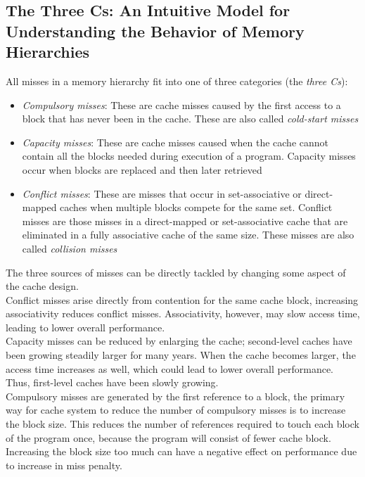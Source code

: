 \documentclass[12pt]{article}
\theoremstyle{definition}
\begin{document}
  \subsection{The Three Cs: An Intuitive Model for Understanding the Behavior of Memory Hierarchies}
  All misses in a memory hierarchy fit into one of three categories (the \emph{three Cs}):
  \begin{itemize}
    \item \emph{Compulsory misses}: These are cache misses caused by the first access to a block that has never been in the cache.
    These are also called \emph{cold-start misses}
    \item \emph{Capacity misses}: These are cache misses caused when the cache cannot contain all the blocks needed during execution of a program.
    Capacity misses occur when blocks are replaced and then later retrieved
    \item \emph{Conflict misses}: These are misses that occur in set-associative or direct-mapped caches when multiple blocks compete for the same set.
    Conflict misses are those misses in a direct-mapped or set-associative cache that are eliminated in a fully associative cache of the same size.
    These misses are also called \emph{collision misses}
  \end{itemize}

  The three sources of misses can be directly tackled by changing some aspect of the cache design. \\

  Conflict misses arise directly from contention for the same cache block, increasing associativity reduces conflict misses.
  Associativity, however, may slow access time, leading to lower overall performance. \\

  Capacity misses can be reduced by enlarging the cache;
  second-level caches have been growing steadily larger for many years.
  When the cache becomes larger, the access time increases as well, which could lead to lower overall performance.
  Thus, first-level caches have been slowly growing. \\

  Compulsory misses are generated by the first reference to a block, the primary way for cache system to reduce the number of compulsory misses is to increase the block size.
  This reduces the number of references required to touch each block of the program once, because the program will consist of fewer cache block.
  Increasing the block size too much can have a negative effect on performance due to increase in miss penalty.
\end{document}
